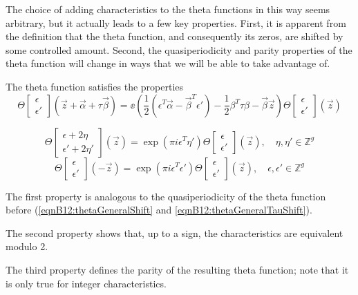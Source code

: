 The choice of adding characteristics to the theta functions in this way seems arbitrary, but it actually leads to a few key properties. First, it is apparent from the definition that the theta function, and consequently its zeros, are shifted by some controlled amount. Second, the quasiperiodicity and parity properties of the theta function will change in ways that we will be able to take advantage of.

\begin{lemma}
    The theta function satisfies the properties
    \begin{equation}\Theta\begin{bmatrix}\epsilon \\ \epsilon'\end{bmatrix}(\vec z + \vec \alpha + \tau \vec \beta) =
    \ee\left(\frac{1}{2}(\epsilon^T \vec \alpha - \vec \beta^T \epsilon') - \frac{1}{2} \beta^T \tau \beta - \vec \beta \vec z\right)
    \Theta\begin{bmatrix}\epsilon \\ \epsilon'\end{bmatrix}(\vec z)
    \end{equation}

    \begin{equation}\Theta\begin{bmatrix}\epsilon + 2\eta \\ \epsilon' + 2\eta' \end{bmatrix}(\vec z) = \exp(\pi i \epsilon^T \eta')
    \Theta\begin{bmatrix}\epsilon \\ \epsilon'\end{bmatrix}(\vec z) , \quad \eta,\eta' \in \mathbb Z^g\end{equation}
    \begin{equation}\Theta\begin{bmatrix}\epsilon \\ \epsilon'\end{bmatrix}(-\vec z) = \exp(\pi i \epsilon^T \epsilon') \Theta\begin{bmatrix}\epsilon \\ \epsilon'\end{bmatrix}(\vec z) , \quad \epsilon,\epsilon' \in \mathbb Z^g\end{equation}

    The first property is analogous to the quasiperiodicity of the theta function before (\ref{eqnB12:thetaGeneralShift} and \ref{eqnB12:thetaGeneralTauShift}).
    
    The second property shows that, up to a sign, the characteristics are equivalent modulo 2.
    
    The third property defines the parity of the resulting theta function; note that it is only true for integer characteristics.
\end{lemma}

